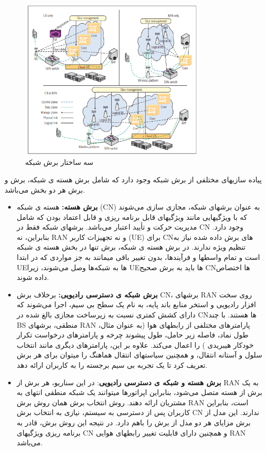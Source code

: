 \begin{figure}
  \centering
    \includegraphics[width=0.8\textwidth]{./fig/NS}
  \caption{سه ساختار برش شبکه \cite{NS2}}
  \label{fig:NS}
\end{figure} 
پیاده سازیهای مختلفی از برش شبکه وجود دارد که شامل برش هسته ی شبکه، برش  و برش هر دو بخش می‌باشد\cite{NS2}.
\begin{itemize}
\item \textbf{برش هسته:}
هسته ی شبکه (CN) 
به عنوان برشهای شبکه، مجازی سازی می‌شوند که با ویژگیهایی مانند ویژگیهای قابل برنامه ریزی و قابل اعتماد بودن که شامل مدیریت حرکت و تأیید اعتبار می‌باشد.
برشهای شبکه فقط در CN وجود دارد.
  بنابراین، نه RAN و نه تجهیزات کاربر (UE) برای CNهای برش داده شده نیاز به تنظیم ویژه ندارند.
  در برش هسته ی شبکه، برش تنها در بخش هسته ی شبکه است و تمام واسطها و فرآیندها، بدون تغییر باقی میمانند
  به جز مواردی که در ابتدا UEها به شبکه‌‌ها وصل می‌شوند، زیرا UEها باید به برش صحیح CNها اختصاص داده شوند.
\item \textbf{
برش شبکه ی دسترسی رادیویی:
}
برخلاف برش CN،
برشهای RAN روی سخت افزار رادیویی و استخر منابع باند پایه، به نام یک سطح بی سیم، اجرا می‌شوند که دارای کشش کمتری نسبت به زیرساخت مجازی بالغ شده در CNها هستند.
با چند BS منطقی، برشهای RAN پارامترهای مختلفی از رابطهای هوا (به عنوان مثال، طول نماد، فاصله زیر حامل، طول پیشوند چرخه و پارامترهای درخواست تکرار خودکار هیبریدی ) را اعمال می‌کند.
علاوه بر این، پارامترهای دیگری مانند انتخاب سلول و آستانه انتقال، و همچنین سیاستهای انتقال هماهنگ را میتوان برای هر برش تعریف کرد تا یک تجربه بی سیم برجسته را به کاربران ارائه دهد.
\item \textbf{برش هسته و شبکه ی دسترسی رادیویی}:
در این سناریو، هر برش از RAN به یک برش از هسته متصل می‌شود، بنابراین اپراتورها میتوانند یک شبکه منطقی انتهای به مشتریان ارائه دهند.
روش انتخاب برش همان روش برش RAN است، بنابراین کاربران پس از دسترسی به سیستم، نیازی به انتخاب برش CN ندارند.
این مدل از برش مزایای هر دو مدل از برش را باهم دارد.
 در نتیجه این روش برش، قادر به برنامه ریزی ویژگیهای CN و همچنین دارای قابلیت تغییر رابطهای هوایی RAN
 می‌باشد.
 
\end{itemize}


